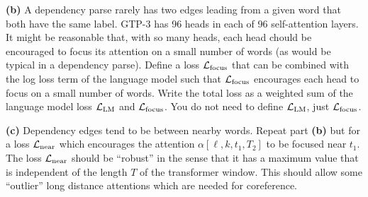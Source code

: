 \documentclass{article}
\newcommand{\solution}[1]{}
\begin{document}
\medskip
{\bf (b)} A dependency parse rarely has two edges leading from a given word that both have the same label.  GTP-3 has 96 heads in each of 96 self-attention layers.
It might be reasonable that, with so many heads, each head chould be encouraged to focus its attention on a small number of words (as would be typical in a dependency parse).
Define a loss ${\cal L}_{\mathrm{focus}}$ that can be combined with the log loss term of the language model such that
${\cal L}_{\mathrm{focus}}$ encourages each head to focus on a small number of words.  Write the total loss as a weighted sum of the language model loss ${\cal L}_{\mathrm{LM}}$
and ${\cal L}_{\mathrm{focus}}$.  You do not need to define ${\cal L}_{\mathrm{LM}}$, just ${\cal L}_\mathrm{focus}$.

\solution{
  \begin{eqnarray*}
    {\cal L}_{\mathrm{total}} & = & {\cal L}_{\mathrm{LM}} + \lambda {\cal L}_{\mathrm{focus}} \\
    \\
      {\cal L}_{\mathrm{focus}} & = & \frac{1}{KTL} \;\sum_{\ell,k,t_1} \;H(k,t_1,T_2) \\
      \\
      & = & \frac{1}{KTL} \sum_{\ell, k,t_1}\;\sum_{t_2} \; \alpha[\ell,k,t_1,t_2] (-\ln \alpha[\ell,k,t_1,t_2])
  \end{eqnarray*}

  The factor of $\frac{1}{KTL}$ can be incorporated into $\lambda$ which is also a correct solution although it introduces a stronger
  coupling of the hyper-parameter $\lambda$ with the size of the transformer model.
}

\medskip
    {\bf (c)} Dependency edges tend to be between nearby words.
    Repeat part {\bf (b)} but for a loss ${\cal L}_{\mathrm{near}}$ which encourages the attention $\alpha[\ell,k,t_1,T_2]$ to be focused near $t_1$.
The loss ${\cal L}_{\mathrm{near}}$ should be ``robust'' in the sense that it has a maximum value that is independent of the length $T$ of the transformer
window.  This should allow some ``outlier'' long distance attentions which are needed for coreference.

\solution{
  \begin{eqnarray*}
    {\cal L}_{\mathrm{total}} & = & {\cal L}_{\mathrm{LM}} + \lambda {\cal L}_{\mathrm{near}} \\
    \\
    {\cal L}_{\mathrm{near}} & = & \frac{1}{KT(L-1)} \sum_{k,t_1,0 \leq \ell \leq L-2}\;\min\left(L_{\mathrm{max}}, \sum_{t_2} \; \alpha[\ell,k,t_1,t_2] (t_1-t_2)^2\right)
  \end{eqnarray*}

  Other solutions are also possible.
}
\end{document}
